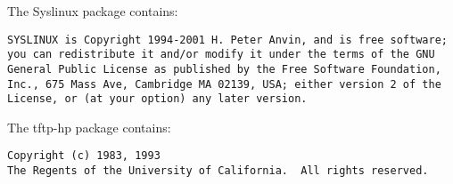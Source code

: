 The Syslinux package contains:

\begin{verbatim}
SYSLINUX is Copyright 1994-2001 H. Peter Anvin, and is free software;
you can redistribute it and/or modify it under the terms of the GNU
General Public License as published by the Free Software Foundation,
Inc., 675 Mass Ave, Cambridge MA 02139, USA; either version 2 of the
License, or (at your option) any later version.
\end{verbatim}

The tftp-hp package contains:

\begin{verbatim}
Copyright (c) 1983, 1993
The Regents of the University of California.  All rights reserved.
\end{verbatim}


